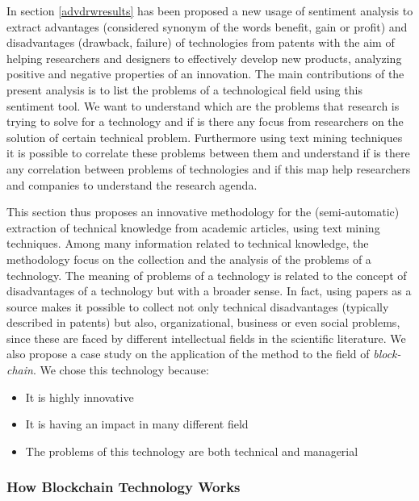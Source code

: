 \documentclass[]{book}
\providecommand{\tightlist}{%
  \setlength{\itemsep}{0pt}\setlength{\parskip}{0pt}}
\theoremstyle{definition}
\theoremstyle{definition}
\theoremstyle{definition}
\theoremstyle{remark}
\begin{document}
In section \ref{advdrwresults} has been proposed a new usage of
sentiment analysis to extract advantages (considered synonym of the
words benefit, gain or profit) and disadvantages (drawback, failure) of
technologies from patents with the aim of helping researchers and
designers to effectively develop new products, analyzing positive and
negative properties of an innovation. The main contributions of the
present analysis is to list the problems of a technological field using
this sentiment tool. We want to understand which are the problems that
research is trying to solve for a technology and if is there any focus
from researchers on the solution of certain technical problem.
Furthermore using text mining techniques it is possible to correlate
these problems between them and understand if is there any correlation
between problems of technologies and if this map help researchers and
companies to understand the research agenda.

This section thus proposes an innovative methodology for the
(semi-automatic) extraction of technical knowledge from academic
articles, using text mining techniques. Among many information related
to technical knowledge, the methodology focus on the collection and the
analysis of the problems of a technology. The meaning of problems of a
technology is related to the concept of disadvantages of a technology
but with a broader sense. In fact, using papers as a source makes it
possible to collect not only technical disadvantages (typically
described in patents) but also, organizational, business or even social
problems, since these are faced by different intellectual fields in the
scientific literature. We also propose a case study on the application
of the method to the field of \emph{block-chain}. We chose this
technology because:

\begin{itemize}
\tightlist
\item
  It is highly innovative
\item
  It is having an impact in many different field
\item
  The problems of this technology are both technical and managerial
\end{itemize}

\subsubsection*{How Blockchain Technology
Works}\label{how-blockchain-technology-works}
\end{document}
